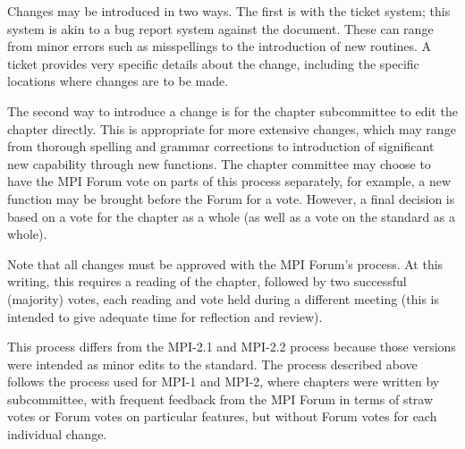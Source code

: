 \documentclass[letterpaper,twoside,11pt,fleqn]{article}
\def\MPI/{\textsf{MPI}}    %
\begin{document}

Changes may be introduced in two ways.  The first is with the ticket
system; this system is akin to a bug report system against the
document.  These can range from minor errors such as misspellings to
the introduction of new routines.  A ticket provides very specific
details about the change, including the specific locations where
changes are to be made.

The second way to introduce a change is for the chapter subcommittee
to edit the chapter directly.  This is appropriate for more extensive
changes, which may range from thorough spelling and grammar
corrections to introduction of significant new capability through new
functions.  The chapter committee may choose to have the \MPI/ Forum
vote on parts of this process separately, for example, a new function
may be brought before the Forum for a vote.  However, a final decision
is based on a vote for the chapter as a whole (as well as a vote on
the standard as a whole).

Note that all changes must be approved with the \MPI/ Forum's process.
At this writing, this requires a reading of the chapter, followed by
two successful (majority) votes, each reading and vote held during a
different meeting (this is intended to give adequate time for
reflection and review).

This process differs from the \MPI/-2.1 and \MPI/-2.2 process because
those versions were intended as minor edits to the standard.  The
process described above follows the process used for \MPI/-1 and \MPI/-2,
where chapters were written by subcommittee, with frequent feedback
from the \MPI/ Forum in terms of straw votes or Forum votes on
particular features, but without Forum votes for each individual change.

\end{document}
